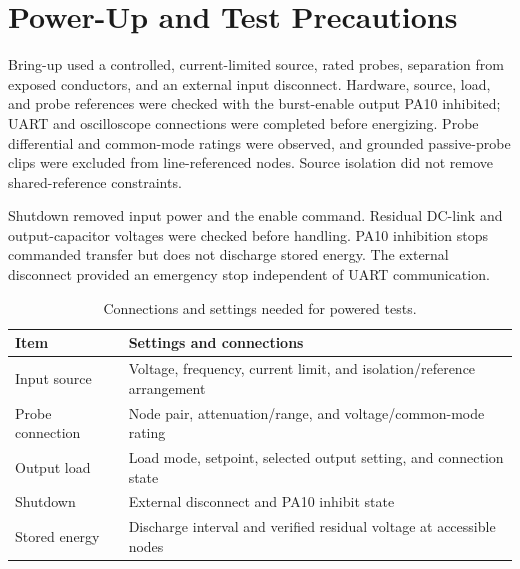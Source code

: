 \section{Power-Up and Test Precautions}
\label{sec:method-safety}

Bring-up used a controlled, current-limited source, rated probes, separation
from exposed conductors, and an external input disconnect. Hardware, source,
load, and probe references were checked with the burst-enable output PA10
inhibited; UART and oscilloscope connections were completed before energizing.
Probe differential and common-mode ratings were observed, and grounded
passive-probe clips were excluded from line-referenced nodes. Source isolation
did not remove shared-reference constraints.

Shutdown removed input power and the enable command. Residual DC-link and
output-capacitor voltages were checked before handling. PA10 inhibition stops
commanded transfer but does not discharge stored energy. The external
disconnect provided an emergency stop independent of UART communication.

\begin{table}[htbp]
\centering
\caption{Connections and settings needed for powered tests.}
\label{tab:method-safety-metadata}
\begin{tabularx}{\textwidth}{@{}p{}X@{}}
\toprule
Item & Settings and connections\\
\midrule
Input source & Voltage, frequency, current limit, and isolation/reference arrangement\\
Probe connection & Node pair, attenuation/range, and voltage/common-mode rating\\
Output load & Load mode, setpoint, selected output setting, and connection state\\
Shutdown & External disconnect and PA10 inhibit state\\
Stored energy & Discharge interval and verified residual voltage at accessible nodes\\
\bottomrule
\end{tabularx}
\end{table}
